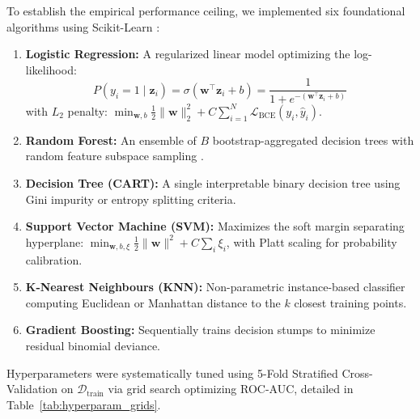 \documentclass[12pt,a4paper,oneside]{report}
\begin{document}
To establish the empirical performance ceiling, we implemented six foundational algorithms using Scikit-Learn \citep{pedregosa2011scikit}:
\begin{enumerate}
    \item \textbf{Logistic Regression:} A regularized linear model optimizing the log-likelihood:
    \begin{equation}
    P(y_i=1 \mid \mathbf{z}_i) = \sigma(\mathbf{w}^\top \mathbf{z}_i + b) = \frac{1}{1 + e^{-(\mathbf{w}^\top \mathbf{z}_i + b)}}
    \end{equation}
    with $L_2$ penalty: $\min_{\mathbf{w}, b} \frac{1}{2} \|\mathbf{w}\|_2^2 + C \sum_{i=1}^{N} \mathcal{L}_{\text{BCE}}(y_i, \hat{y}_i)$.
    \item \textbf{Random Forest:} An ensemble of $B$ bootstrap-aggregated decision trees with random feature subspace sampling \citep{breiman2001random}.
    \item \textbf{Decision Tree (CART):} A single interpretable binary decision tree using Gini impurity or entropy splitting criteria.
    \item \textbf{Support Vector Machine (SVM):} Maximizes the soft margin separating hyperplane: $\min_{\mathbf{w}, b, \xi} \frac{1}{2} \|\mathbf{w}\|^2 + C \sum_{i} \xi_i$, with Platt scaling for probability calibration.
    \item \textbf{K-Nearest Neighbours (KNN):} Non-parametric instance-based classifier computing Euclidean or Manhattan distance to the $k$ closest training points.
    \item \textbf{Gradient Boosting:} Sequentially trains decision stumps to minimize residual binomial deviance.
\end{enumerate}

Hyperparameters were systematically tuned using 5-Fold Stratified Cross-Validation on $\mathcal{D}_{\text{train}}$ via grid search optimizing ROC-AUC, detailed in Table~\ref{tab:hyperparam_grids}.
\end{document}
